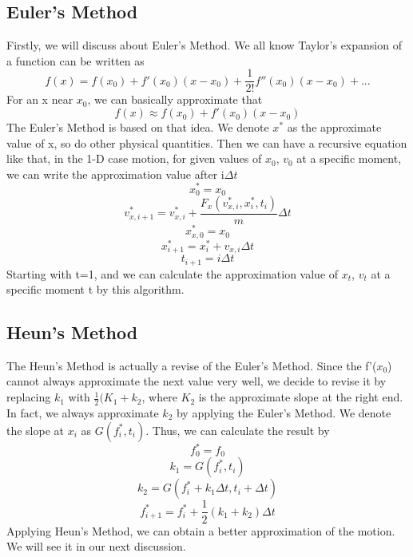 \documentclass[12pt]{report}
\begin{document}
\subsection{Euler's Method}
Firstly, we will discuss about Euler's Method. We all know Taylor's expansion of a function can be written as
\begin{equation}
    f(x)=f(x_{0})+f'(x_{0})(x-x_{0})+\frac{1}{2!}f''(x_{0})(x-x_{0})+...
\end{equation}
For an x near $x_{0}$, we can basically approximate that
\begin{equation}
    f(x)\approx f(x_{0})+f'(x_{0})(x-x_{0})
\end{equation}
The Euler's Method is based on that idea. We denote $x^*$ as the approximate value of x, so do other physical quantities. Then we can have a recursive equation like that, in the 1-D case motion, for given values of $x_{0}$, $v_{0}$ at a specific moment, we can write the approximation value after i$\Delta t$
\begin{equation}
    x_{0}^*=x_{0}
\end{equation}
\begin{equation}
    v_{x,i+1}^*=v_{x,i}^*+\frac{F_{x}(v_{x,i}^*,x_{i}^*,t_{i})}{m}\Delta t
\end{equation}
\begin{equation}
    x_{x,0}^*=x_{0}
\end{equation}
\begin{equation}
    x_{i+1}^*=x_{i}^*+v_{x,i}\Delta t
\end{equation}
\begin{equation}
    t_{i+1}=i\Delta t
\end{equation}
Starting with t=1, and we can calculate the approximation value of $x_{t}$, $v_{t}$ at a specific moment t by this algorithm.
\subsection{Heun's Method}
The Heun's Method is actually a revise of the Euler's Method. Since the f'($x_{0}$) cannot always approximate the next value very well, we decide to revise it by replacing $k_{1}$ with $\frac{1}{2}(K_{1}+k_{2}$, where $K_{2}$ is the approximate slope at the right end. In fact, we always approximate $k_{2}$ by applying the Euler's Method. We denote the slope at $x_{i}$ as $G(f_{i}^*,t_{i})$. Thus, we can calculate the result by
\begin{equation}
    f_{0}^*=f_{0}
\end{equation}
\begin{equation}
    k_{1}=G(f_{i}^*,t_{i})
\end{equation}
\begin{equation}
    k_{2}=G(f_{i}^*+k_{1}\Delta t,t_{i}+\Delta t)
\end{equation}
\begin{equation}
    f_{i+1}^*=f_{i}^*+\frac{1}{2}(k_{1}+k_{2})\Delta t
\end{equation}
Applying Heun's Method, we can obtain a better approximation of the motion. We will see it in our next discussion.
\clearpage
\end{document}
